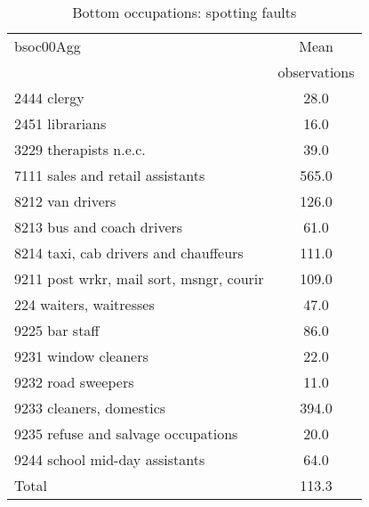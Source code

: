 \begin{table}
	\centering
	\caption{Bottom occupations: spotting faults}
	\begin{tabular}{lc}
	\toprule	
		
bsoc00Agg&Mean \\
&observations \\
\hline
2444 clergy&28.0 \\
2451 librarians&16.0 \\
3229 therapists n.e.c.&39.0 \\
7111 sales and retail assistants&565.0 \\
8212 van drivers&126.0 \\
8213 bus and coach drivers&61.0 \\
8214 taxi, cab drivers and chauffeurs&111.0 \\
9211 post wrkr, mail sort, msngr, courir&109.0 \\
224 waiters, waitresses&47.0 \\
9225 bar staff&86.0 \\
9231 window cleaners&22.0 \\
9232 road sweepers&11.0 \\
9233 cleaners, domestics&394.0 \\
9235 refuse and salvage occupations&20.0 \\
9244 school mid-day assistants&64.0 \\
Total&113.3 \\
\bottomrule
\bottomrule
\end{tabular}
\end{table}
